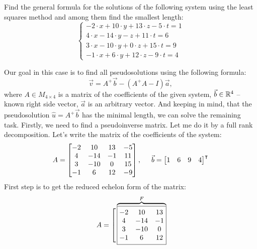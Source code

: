 \documentclass[12pt]{report}
\begin{document}
\begin{problem}{}
   Find the general formula for the solutions of the following system using the least squares method and among them find the smallest length:
   \[
      \left\{
         \begin{array}{c}
            -2\cdot x + 10\cdot y + 13\cdot z - 5\cdot t = 1\\
            4 \cdot x - 14\cdot y - z + 11\cdot t = 6\\
            3\cdot x - 10\cdot y + 0\cdot z + 15\cdot t = 9\\
            -1\cdot x + 6 \cdot y + 12 \cdot z - 9\cdot t = 4 
         \end{array}
      \right.
   \]
\end{problem}

\begin{solution}
   Our goal in this case is to find all pseudosolutions using the following formula:
   \[
      \vec{v} = A^+\vec{b} - (A^+A - I) \vec{a}, 
   \]
   where $A \in M_{4 \times 4}$ is a matrix of the coefficients of the given system, $\vec{b} \in \mathbb{R}^4$ -- known right side vector, $\vec{a}$ is an arbitrary vector. And keeping in mind, that the pseudosolution $\hat{u} = A^+ \vec{b}$ has the minimal length, we can solve the remaining task. Firstly, we need to find a pseudoinverse matrix. Let me do it by a full rank decomposition. Let's write the matrix of the coefficients of the system:
   \[
       A = \begin{bmatrix}
         -2 & 10 & 13 & -5 \\
         4 & -14 & -1 & 11 \\
         3 & -10 & 0 & 15 \\
         -1 & 6 & 12 & -9
       \end{bmatrix}, \hspace*{0.5cm} \vec{b} = \begin{bmatrix}
         1 & 6 & 9 & 4
       \end{bmatrix}^\intercal
   \] 
   First step is to get the reduced echelon form of the matrix:
   \[
       A = 
       \Vast[
            \overbrace{\fbox{$\begin{matrix}
                -2 & 10 & 13 \\
                4 & -14 & -1 \\
                3 & -10 & 0 \\
                -1 & 6 & 12
            \end{matrix}$}}^{F} \hspace*{0.25cm} \begin{matrix}

\end{matrix}\]
\end{solution}
\end{document}
